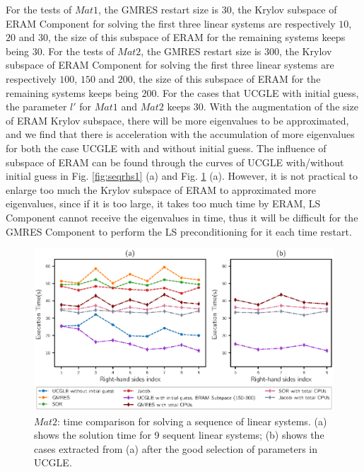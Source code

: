 For the tests of $Mat1$, the GMRES restart size is $30$, the Krylov subspace of ERAM Component for solving the first three linear systems are respectively $10$, $20$ and $30$, the size of this subspace of ERAM for the remaining systems keeps being $30$. For the tests of $Mat2$, the GMRES restart size is $300$, the Krylov subspace of ERAM Component for solving the first three linear systems are respectively $100$, $150$ and $200$, the size of this subspace of ERAM for the remaining systems keeps being $200$. For the cases that UCGLE with initial guess, the parameter $l'$ for $Mat1$ and $Mat2$ keeps $30$. With the augmentation of the size of ERAM Krylov subspace, there will be more eigenvalues to be approximated, and we find that there is acceleration with the accumulation of more eigenvalues for both the case UCGLE with and without initial guess. The influence of subspace of ERAM can be found through the curves of UCGLE with/without initial guess in Fig. \ref{fig:seqrhs1} (a) and Fig. \ref{fig:seqrhs3} (a). However, it is not practical to enlarge too much the Krylov subspace of ERAM to approximated more eigenvalues, since if it is too large, it takes too much time by ERAM, LS Component cannot receive the eigenvalues in time, thus it will be difficult for the GMRES Component to perform the LS preconditioning for it each time restart.

\begin{figure}[htbp]
	\centering
	\includegraphics[width=6.4in]{fig/seqrhs3.eps}
	\caption{$Mat2$: time comparison for solving a sequence of linear systems. (a) shows the solution time for 9 sequent linear systems; (b) shows the cases extracted from (a) after the good selection of parameters in UCGLE.}
	\label{fig:seqrhs3}
\end{figure}

